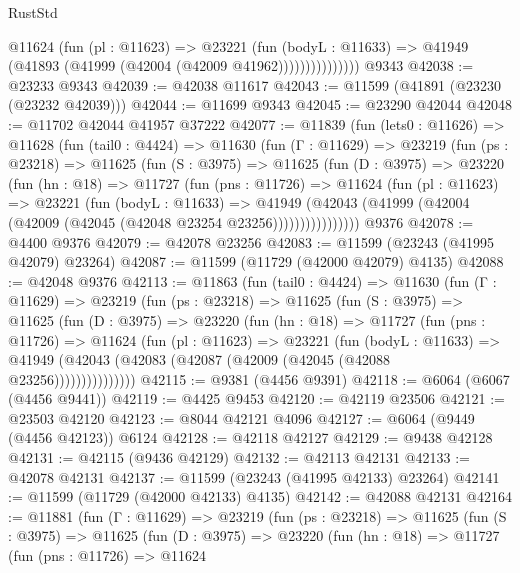 \begin{lexlean}{RustStd}
\begin{coremodule}
                    @11624
                      (fun (pl : @11623) =>
                      @23221
                        (fun (bodyL : @11633) =>
                        @41949 (@41893 (@41999 (@42004 (@42009 @41962)))))))))))))))
    @9343
@42038 := @23233 @9343
@42039 := @42038 @11617
@42043 := @11599 (@41891 (@23230 (@23232 @42039)))
@42044 := @11699 @9343
@42045 := @23290 @42044
@42048 := @11702 @42044 @41957 @37222
@42077 := @11839
    (fun (lets0 : @11626) =>
    @11628
      (fun (tail0 : @4424) =>
      @11630
        (fun (Γ : @11629) =>
        @23219
          (fun (ps : @23218) =>
          @11625
            (fun (S : @3975) =>
            @11625
              (fun (D : @3975) =>
              @23220
                (fun (hn : @18) =>
                @11727
                  (fun (pns : @11726) =>
                  @11624
                    (fun (pl : @11623) =>
                    @23221
                      (fun (bodyL : @11633) =>
                      @41949
                        (@42043
                          (@41999 (@42004 (@42009 (@42045 (@42048 @23254 @23256))))))))))))))))
    @9376
@42078 := @4400 @9376
@42079 := @42078 @23256
@42083 := @11599 (@23243 (@41995 @42079) @23264)
@42087 := @11599 (@11729 (@42000 @42079) @4135)
@42088 := @42048 @9376
@42113 := @11863
    (fun (tail0 : @4424) =>
    @11630
      (fun (Γ : @11629) =>
      @23219
        (fun (ps : @23218) =>
        @11625
          (fun (S : @3975) =>
          @11625
            (fun (D : @3975) =>
            @23220
              (fun (hn : @18) =>
              @11727
                (fun (pns : @11726) =>
                @11624
                  (fun (pl : @11623) =>
                  @23221
                    (fun (bodyL : @11633) =>
                    @41949 (@42043 (@42083 (@42087 (@42009 (@42045 (@42088 @23256)))))))))))))))
@42115 := @9381 (@4456 @9391)
@42118 := @6064 (@6067 (@4456 @9441))
@42119 := @4425 @9453
@42120 := @42119 @23506
@42121 := @23503 @42120
@42123 := @8044 @42121 @4096
@42127 := @6064 (@9449 (@4456 @42123)) @6124
@42128 := @42118 @42127
@42129 := @9438 @42128
@42131 := @42115 (@9436 @42129)
@42132 := @42113 @42131
@42133 := @42078 @42131
@42137 := @11599 (@23243 (@41995 @42133) @23264)
@42141 := @11599 (@11729 (@42000 @42133) @4135)
@42142 := @42088 @42131
@42164 := @11881
    (fun (Γ : @11629) =>
    @23219
      (fun (ps : @23218) =>
      @11625
        (fun (S : @3975) =>
        @11625
          (fun (D : @3975) =>
          @23220
            (fun (hn : @18) =>
            @11727
              (fun (pns : @11726) =>
              @11624

\end{coremodule}
\end{lexlean}
